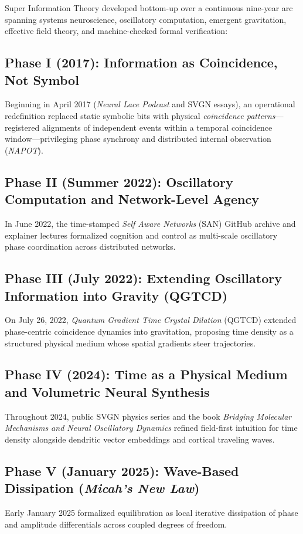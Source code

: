 Super Information Theory developed bottom-up over a continuous nine-year arc spanning systems neuroscience, oscillatory computation, emergent gravitation, effective field theory, and machine-checked formal verification:

\subsection{Phase I (2017): Information as Coincidence, Not Symbol}
Beginning in April 2017 (\emph{Neural Lace Podcast} and SVGN essays), an operational redefinition replaced static symbolic bits with physical \emph{coincidence patterns}---registered alignments of independent events within a temporal coincidence window---privileging phase synchrony and distributed internal observation (\emph{NAPOT}).

\subsection{Phase II (Summer 2022): Oscillatory Computation and Network-Level Agency}
In June 2022, the time-stamped \emph{Self Aware Networks} (SAN) GitHub archive and explainer lectures formalized cognition and control as multi-scale oscillatory phase coordination across distributed networks.

\subsection{Phase III (July 2022): Extending Oscillatory Information into Gravity (QGTCD)}
On July 26, 2022, \emph{Quantum Gradient Time Crystal Dilation} (QGTCD) extended phase-centric coincidence dynamics into gravitation, proposing time density as a structured physical medium whose spatial gradients steer trajectories.

\subsection{Phase IV (2024): Time as a Physical Medium and Volumetric Neural Synthesis}
Throughout 2024, public SVGN physics series and the book \emph{Bridging Molecular Mechanisms and Neural Oscillatory Dynamics} refined field-first intuition for time density alongside dendritic vector embeddings and cortical traveling waves.

\subsection{Phase V (January 2025): Wave-Based Dissipation (\emph{Micah's New Law})}
Early January 2025 formalized equilibration as local iterative dissipation of phase and amplitude differentials across coupled degrees of freedom.

